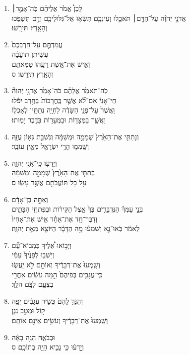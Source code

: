\documentclass[12pt,a4paper,titlepage]{article}
\def \pslabelsep{-0.9em} %
\def \psleftmargin{0em} %
\begin{document}
\begin{enumerate}[leftmargin=\psleftmargin, labelsep = \pslabelsep, label={\arabic*}, font=\color{\pscolor}\small\textsuperscript, parsep=0em, itemsep=0em, topsep=0em ]
\item \texthebrew{לָכֵן֩ אֱמֹ֙ר אֲלֵיהֶ֜ם כֹּֽה־אָמַ֣ר׀ \\ אֲדֹנָ֣י יְהֹוִ֗ה עַל־הַדָּ֧ם׀ תֹּאכֵ֛לוּ וְעֵינֵכֶ֛ם תִּשְׂא֥וּ אֶל־גִּלּוּלֵיכֶ֖ם וְדָ֣ם תִּשְׁפֹּ֑כוּ \\ וְהָאָ֖רֶץ תִּירָֽשׁוּ׃}
\item \texthebrew{עֲמַדְתֶּ֤ם עַֽל־חַרְבְּכֶם֙ \\ עֲשִׂיתֶ֣ן תּוֹעֵבָ֔ה \\ וְאִ֛ישׁ אֶת־אֵ֥שֶׁת רֵעֵ֖הוּ טִמֵּאתֶ֑ם \\ וְהָאָ֖רֶץ תִּירָֽשׁוּ׃ ס}\verseSpace
\item \texthebrew{כֹּֽה־תֹאמַ֙ר אֲלֵהֶ֜ם כֹּה־אָמַ֙ר אֲדֹנָ֣י יְהוִה֘ \\ חַי־אָנִי֒ אִם־לֹ֞א אֲשֶׁ֤ר בֶּֽחֳרָבוֹת֙ בַּחֶ֣רֶב יִפֹּ֔לוּ \\ וַֽאֲשֶׁר֙ עַל־פְּנֵ֣י הַשָּׂדֶ֔ה לַחַיָּ֥ה נְתַתִּ֖יו לְאָכְל֑וֹ \\ וַאֲשֶׁ֛ר בַּמְּצָד֥וֹת וּבַמְּעָר֖וֹת בַּדֶּ֥בֶר יָמֽוּתוּ׃}
\item \texthebrew{וְנָתַתִּ֤י אֶת־הָאָ֙רֶץ֙ שְׁמָמָ֣ה וּמְשַׁמָּ֔ה וְנִשְׁבַּ֖ת גְּא֣וֹן עֻזָּ֑הּ \\ וְשָֽׁמְמ֛וּ הָרֵ֥י יִשְׂרָאֵ֖ל מֵאֵ֥ין עוֹבֵֽר׃}
\item \texthebrew{וְיָדְע֖וּ כִּֽי־אֲנִ֣י יְהוָ֑ה \\ בְּתִתִּ֤י אֶת־הָאָ֙רֶץ֙ שְׁמָמָ֣ה וּמְשַׁמָּ֔ה \\ עַ֥ל כָּל־תּוֹעֲבֹתָ֖ם אֲשֶׁ֥ר עָשֽׂוּ׃ ס}\verseSpace
\item \texthebrew{וְאַתָּ֣ה בֶן־אָדָ֔ם \\ בְּנֵ֣י עַמְּךָ֗ הַנִּדְבָּרִ֤ים בְּךָ֙ אֵ֣צֶל הַקִּיר֔וֹת וּבְפִתְחֵ֖י הַבָּתִּ֑ים \\ וְדִבֶּר־חַ֣ד אֶת־אַחַ֗ד אִ֤ישׁ אֶת־אָחִיו֙ \\ לֵאמֹ֔ר בֹּֽאוּ־נָ֣א וְשִׁמְע֔וּ מָ֣ה הַדָּבָ֔ר הַיּוֹצֵ֖א מֵאֵ֥ת יְהוָֽה׃}\verseSpace
\item \texthebrew{וְיָב֣וֹאוּ אֵ֠לֶיךָ כִּמְבוֹא־עָ֞ם \\ וְיֵשְׁב֤וּ לְפָנֶ֙יךָ֙ עַמִּ֔י \\ וְשָֽׁמְעוּ֙ אֶת־דְּבָרֶ֔יךָ וְאוֹתָ֖ם לֹ֣א יַֽעֲשׂ֑וּ \\ כִּֽי־עֲגָבִ֤ים בְּפִיהֶם֙ הֵ֣מָּה עֹשִׂ֔ים אַחֲרֵ֥י \\ בִצְעָ֖ם לִבָּ֥ם הֹלֵֽךְ׃}\verseSpace
\item \texthebrew{וְהִנְּךָ֤ לָהֶם֙ כְּשִׁ֣יר עֲגָבִ֔ים יְפֵ֥ה \\ ק֖וֹל וּמֵטִ֣ב נַגֵּ֑ן \\ וְשָֽׁמְעוּ֙ אֶת־דְּבָרֶ֔יךָ וְעֹשִׂ֥ים אֵינָ֖ם אוֹתָֽם׃}\verseSpace
\item \texthebrew{וּבְבֹאָ֑הּ הִנֵּ֣ה בָאָ֔ה \\ וְיָ֣דְע֔וּ כִּ֥י נָבִ֖יא הָיָ֥ה בְתוֹכָֽם׃ ס}
\end{enumerate}
\newpage
\end{document}
